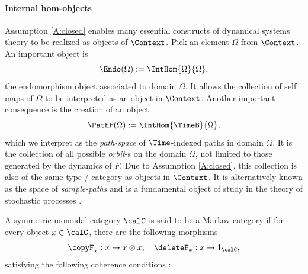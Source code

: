 \documentclass[12pt,oneside,pb-diagram]{article}
\begin{document}
\paragraph{Internal hom-objects} Assumption \ref{A:closed} enables many essential constructs of dynamical systems theory to be realized as objects of $\Context$. Pick an element $\Omega$ from $\Context$. An important object is
%
\begin{equation} \label{eqn:def:Endo}
	\Endo (\Omega) := \IntHom{\Omega}{\Omega} ,
\end{equation}
%
the {endomorphism} object associated to domain $\Omega$. It allows the collection of self maps of $\Omega$ to be interpreted as an object in $\Context$. Another important consequence is the creation of an object 
%
\begin{equation} \label{eqn:def:Path:1}
	\PathF(\Omega) := \IntHom{\TimeB}{\Omega} ,
\end{equation}
%
which we interpret as the \emph{path-space} of $\Time$-indexed paths in domain $\Omega$. It is the collection of all possible \emph{orbit}-s on the domain $\Omega$, not limited to those generated by the dynamics of $F$. Due to Assumption \ref{A:closed}, this collection is also of the same type / category as objects in $\Context$. It is alternatively known as the space of  \emph{sample-paths} and is a fundamental object of study in the theory of stochastic processes \cite[e.g.]{Doob1953book}.

\begin{definition} 
	\cite[Def 2.1]{fritz2020Stoch} A symmetric monoidal category $\calC$ is said to be a Markov category if for every object $x\in \calC$, there are the following morphisms
	\[ \copyF_x : x \to x\otimes x , \quad \deleteF_x : x \to 1_{\calC} , \]
	satisfying the following coherence conditions :
\end{definition}
\end{document}
